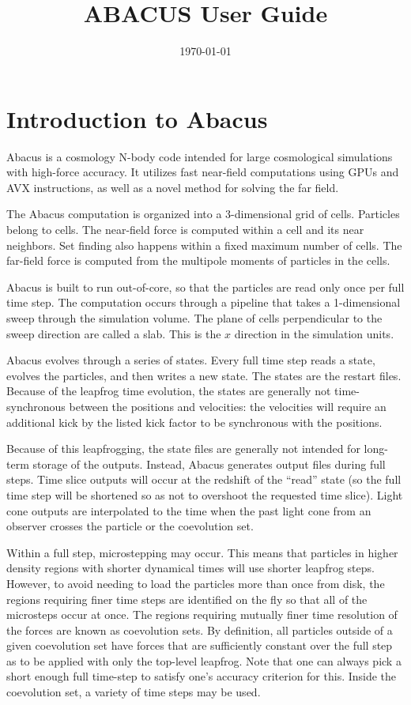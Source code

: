 \documentclass[11pt,preprint]{aastex}
\begin{document}
\title{ABACUS User Guide}
\author{\today}

\section{Introduction to Abacus}

Abacus is a cosmology N-body code intended for large cosmological
simulations with high-force accuracy.  It utilizes fast near-field
computations using GPUs and AVX instructions, as well as a novel
method for solving the far field.

The Abacus computation is organized into a 3-dimensional grid of
cells.  Particles belong to cells.  The near-field force is computed
within a cell and its near neighbors.  Set finding also happens
within a fixed maximum number of cells.  The far-field force is
computed from the multipole moments of particles in the cells.

Abacus is built to run out-of-core, so that the particles are read
only once per full time step.  The computation occurs through a
pipeline that takes a 1-dimensional sweep through the simulation
volume.  The plane of cells perpendicular to the sweep direction
are called a slab.  This is the $x$ direction in the simulation
units.

Abacus evolves through a series of states.  Every full time step
reads a state, evolves the particles, and then writes a new state.
The states are the restart files.  Because of the leapfrog time
evolution, the states are generally not time-synchronous between
the positions and velocities: the velocities will require an
additional kick by the listed kick factor to be synchronous with
the positions.

Because of this leapfrogging, the state files are generally not
intended for long-term storage of the outputs.  Instead, Abacus
generates output files during full steps.  Time slice outputs will
occur at the redshift of the ``read'' state (so the full time step
will be shortened so as not to overshoot the requested time slice).
Light cone outputs are interpolated to the time when the past light
cone from an observer crosses the particle or the coevolution set.

Within a full step, microstepping may occur.  This means that
particles in higher density regions with shorter dynamical times
will use shorter leapfrog steps.  However, to avoid needing to load
the particles more than once from disk, the regions requiring finer
time steps are identified on the fly so that all of the microsteps
occur at once.  The regions requiring mutually finer time resolution
of the forces are known as coevolution sets.  By definition, all
particles outside of a given coevolution set have forces that are
sufficiently constant over the full step as to be applied with only
the top-level leapfrog.  Note that one can always pick a short
enough full time-step to satisfy one's accuracy criterion for this.
Inside the coevolution set, a variety of time steps may be used.
\end{document}
